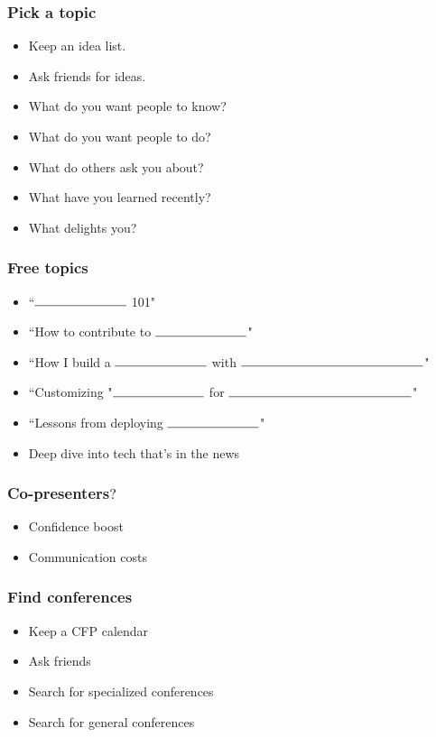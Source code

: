 \documentclass{beamer}
\begin{document}
\begin{frame}[fragile]
\tableofcontents[currentsection]
\end{frame}

\begin{frame}
\frametitle{Pick a topic}
\begin{itemize}[<+(1)->]
\item Keep an idea list.
\item Ask friends for ideas.
\item What do you want people to know?
\item What do you want people to do?
\item What do others ask you about?
\item What have you learned recently?
\item What delights you?
\end{itemize}
\end{frame}

\begin{frame}[fragile]
\frametitle{Free topics}
\begin{itemize}[<+(1)->]
\item ``$\rule{1in}{0.15mm}$ 101"
\item ``How to contribute to $\rule{1in}{0.15mm}$"
\item ``How I build a $\rule{1in}{0.15mm}$ with $\rule{2in}{0.15mm}$"
\item ``Customizing "$\rule{1in}{0.15mm}$ for $\rule{2in}{0.15mm}$"
\item ``Lessons from deploying $\rule{1in}{0.15mm}$"
\item Deep dive into tech that's in the news
\end{itemize}
\end{frame}

\begin{frame}[fragile]
\frametitle{Co-presenters$?$}
\begin{itemize}[<+(1)->]
\item Confidence boost
\item Communication costs
\end{itemize}
\end{frame}

\begin{frame}[fragile]
\frametitle{Find conferences}
\begin{itemize}[<+(1)->]
\item Keep a CFP calendar
\item Ask friends
\item Search for specialized conferences
\item Search for general conferences
\end{itemize}
\end{frame}
\end{document}
